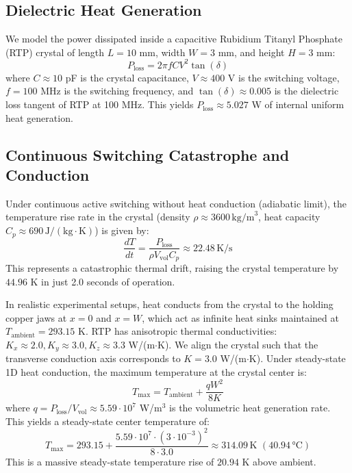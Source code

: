 \documentclass[11pt,twocolumn]{article}
\begin{document}
\subsection{Dielectric Heat Generation}
We model the power dissipated inside a capacitive Rubidium Titanyl Phosphate (RTP) crystal of length $L = 10$ mm, width $W = 3$ mm, and height $H = 3$ mm:
\begin{equation}
P_{\text{loss}} = 2 \pi f C V^2 \tan(\delta)
\end{equation}
where $C \approx 10$ pF is the crystal capacitance, $V \approx 400$ V is the switching voltage, $f = 100$ MHz is the switching frequency, and $\tan(\delta) \approx 0.005$ is the dielectric loss tangent of RTP at 100 MHz. This yields $P_{\text{loss}} \approx 5.027$ W of internal uniform heat generation.

\subsection{Continuous Switching Catastrophe and Conduction}
Under continuous active switching without heat conduction (adiabatic limit), the temperature rise rate in the crystal (density $\rho \approx 3600 \, \text{kg/m}^3$, heat capacity $C_p \approx 690 \, \text{J}/(\text{kg}\cdot\text{K})$) is given by:
\begin{equation}
\frac{dT}{dt} = \frac{P_{\text{loss}}}{\rho V_{\text{vol}} C_p} \approx 22.48 \, \text{K/s}
\end{equation}
This represents a catastrophic thermal drift, raising the crystal temperature by $44.96$ K in just 2.0 seconds of operation.

In realistic experimental setups, heat conducts from the crystal to the holding copper jaws at $x = 0$ and $x = W$, which act as infinite heat sinks maintained at $T_{\text{ambient}} = 293.15$ K. RTP has anisotropic thermal conductivities: $K_x \approx 2.0, K_y \approx 3.0, K_z \approx 3.3$ W/(m$\cdot$K). We align the crystal such that the transverse conduction axis corresponds to $K = 3.0$ W/(m$\cdot$K). Under steady-state 1D heat conduction, the maximum temperature at the crystal center is:
\begin{equation}
T_{\text{max}} = T_{\text{ambient}} + \frac{q W^2}{8 K}
\end{equation}
where $q = P_{\text{loss}}/V_{\text{vol}} \approx 5.59 \cdot 10^7$ W/m$^3$ is the volumetric heat generation rate. This yields a steady-state center temperature of:
\begin{equation}
T_{\text{max}} = 293.15 + \frac{5.59 \cdot 10^7 \cdot (3\cdot 10^{-3})^2}{8 \cdot 3.0} \approx 314.09 \, \text{K} \,\, (40.94 \, \text{°C})
\end{equation}
This is a massive steady-state temperature rise of $20.94$ K above ambient.
\end{document}

